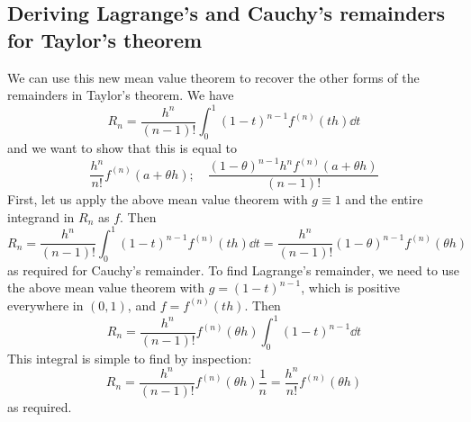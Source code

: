 \subsection{Deriving Lagrange's and Cauchy's remainders for Taylor's theorem}
We can use this new mean value theorem to recover the other forms of the remainders in Taylor's theorem.
We have
\[
	R_n = \frac{h^n}{(n-1)!} \int_0^1 (1-t)^{n-1}f^{(n)}(th) \dd{t}
\]
and we want to show that this is equal to
\[
	\frac{h^n}{n!}f^{(n)}(a + \theta h);\quad \frac{(1 - \theta)^{n-1}h^n f^{(n)}(a + \theta h)}{(n-1)!}
\]
First, let us apply the above mean value theorem with \(g \equiv 1\) and the entire integrand in \(R_n\) as \(f\).
Then
\[
	R_n = \frac{h^n}{(n-1)!} \int_0^1 (1-t)^{n-1}f^{(n)}(th) \dd{t} = \frac{h^n}{(n-1)!} (1-\theta)^{n-1}f^{(n)}(\theta h)
\]
as required for Cauchy's remainder.
To find Lagrange's remainder, we need to use the above mean value theorem with \(g = (1-t)^{n-1}\), which is positive everywhere in \((0, 1)\), and \(f = f^{(n)}(th)\).
Then
\[
	R_n = \frac{h^n}{(n-1)!} f^{(n)}(\theta h) \int_0^1 (1-t)^{n-1}\dd{t}
\]
This integral is simple to find by inspection:
\[
	R_n = \frac{h^n}{(n-1)!} f^{(n)}(\theta h) \frac{1}{n} = \frac{h^n}{n!} f^{(n)}(\theta h)
\]
as required.
